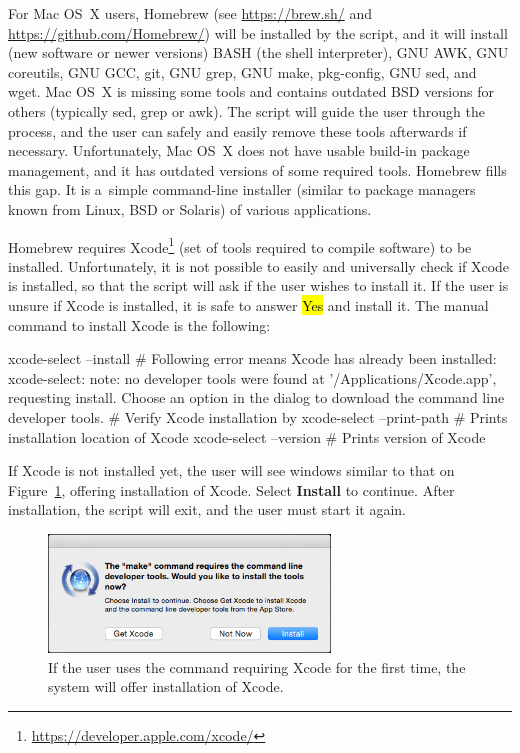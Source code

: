 \documentclass[a4paper, 11pt, twoside]{article}
\renewcommand{\texttt}[1]{\hl{\ttfamily #1}}
\begin{document}
For Mac OS~X users, Homebrew (see \url{https://brew.sh/} and \url{https://github.com/Homebrew/}) will be installed by the script, and it will install (new software or newer versions) BASH (the shell interpreter), GNU AWK, GNU coreutils, GNU GCC, git, GNU grep, GNU make, pkg-config, GNU sed, and wget. Mac OS~X is missing some tools and contains outdated BSD versions for others (typically sed, grep or awk). The script will guide the user through the process, and the user can safely and easily remove these tools afterwards if necessary. Unfortunately, Mac OS~X does not have usable build-in package management, and it has outdated versions of some required tools. Homebrew fills this gap. It is a~simple command-line installer (similar to package managers known from Linux, BSD or Solaris) of various applications.

Homebrew requires Xcode\footnote{\url{https://developer.apple.com/xcode/}} (set of tools required to compile software) to be installed. Unfortunately, it is not possible to easily and universally check if Xcode is installed, so that the script will ask if the user wishes to install it. If the user is unsure if Xcode is installed, it is safe to answer \texttt{Yes} and install it. The manual command to install Xcode is the following:

\begin{bashcode}
  xcode-select --install
  # Following error means Xcode has already been installed:
  xcode-select: note: no developer tools were found at '/Applications/Xcode.app',
    requesting install. Choose an option in the dialog to download the command
    line developer tools.
  # Verify Xcode installation by
  xcode-select --print-path # Prints installation location of Xcode
  xcode-select --version # Prints version of Xcode
\end{bashcode}

If Xcode is not installed yet, the user will see windows similar to that on Figure~\ref{xcode}, offering installation of Xcode. Select \textbf{Install} to continue. After installation, the script will exit, and the user must start it again.

\begin{figure}[htb]
  \begin{center}
    \includegraphics[width=7.5cm]{xcode.png}
  \end{center}
  \caption[Prompt to install Xcode]{If the user uses the command requiring Xcode for the first time, the system will offer installation of Xcode.}
  \label{xcode}
\end{figure}
\end{document}
